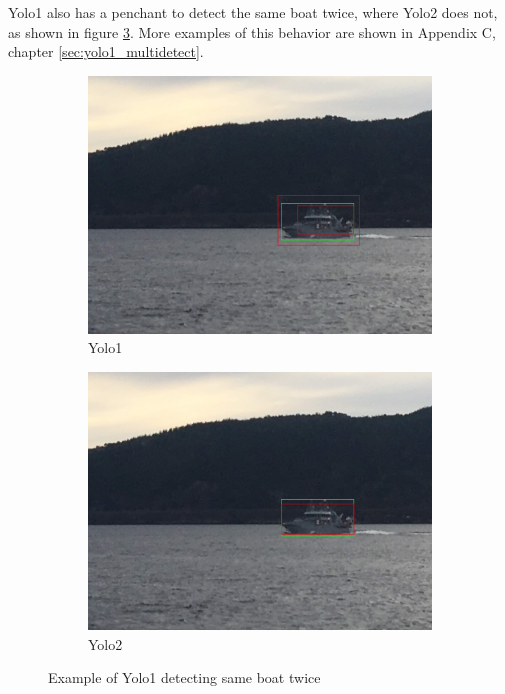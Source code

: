 \newpage

Yolo1 also has a penchant to detect the same boat twice, where Yolo2 does not, as shown in figure \ref{fig:yolo12_multibox}. More examples of this behavior are shown in Appendix C, chapter \ref{sec:yolo1_multidetect}.

\begin{figure}[h!]
\begin{subfigure}{.5\textwidth}
  \centering
  \includegraphics[width=0.8\linewidth]{results/case_tr_moor/yolo12/yolo1/2better/IMG_2269.jpg}
  \caption{Yolo1}
  \label{fig:yolo1_multibox}
\end{subfigure}%
\begin{subfigure}{.5\textwidth}
  \centering
  \includegraphics[width=.8\linewidth]{results/case_tr_moor/yolo12/yolo2/2better/IMG_2269.jpg}
  \caption{Yolo2}
  \label{fig:yolo2_multibox}
\end{subfigure}
\caption{Example of Yolo1 detecting same boat twice}
\label{fig:yolo12_multibox}
\end{figure}

